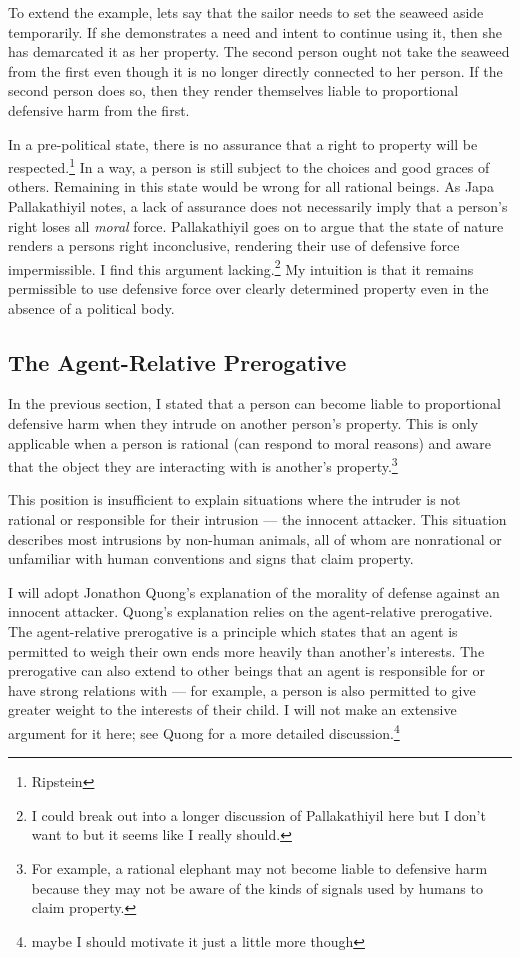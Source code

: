 	To extend the example, lets say that the sailor needs to set the seaweed
	aside temporarily. If she demonstrates a need and intent to continue using
	it, then she has demarcated it as her property. The second person ought not
	take the seaweed from the first even though it is no longer directly
	connected to her person. If the second person does so, then they render
	themselves liable to proportional defensive harm from the first.

	In a pre-political state, there is no assurance that a right to property
	will be respected.\footnote{Ripstein} In a way, a person is still subject
	to the choices and good graces of others. Remaining in this state would be
	wrong for all rational beings. As Japa Pallakathiyil notes, a lack of
	assurance does not necessarily imply that a person’s right loses all
	\emph{moral} force. Pallakathiyil goes on to argue that the state of nature
	renders a persons right inconclusive, rendering their use of defensive
	force impermissible. I find this argument lacking.\footnote{I could break
	out into a longer discussion of Pallakathiyil here but I don’t want to but
	it seems like I really should.} My intuition is that it remains permissible
	to use defensive force over clearly determined property even in the absence
	of a political body.

	\subsection{The Agent-Relative Prerogative}

	In the previous section, I stated that a person can become liable to
	proportional defensive harm when they intrude on another person’s property.
	This is only applicable when a person is rational (can respond to moral
	reasons) and aware that the object they are interacting with is another’s
	property.\footnote{For example, a rational elephant may not become liable
	to defensive harm because they may not be aware of the kinds of signals
	used by humans to claim property.}

	This position is insufficient to explain situations where the intruder is
	not rational or responsible for their intrusion --- the innocent attacker.
	This situation describes most intrusions by non-human animals, all of whom
	are nonrational or unfamiliar with human conventions and signs that claim
	property.

	I will adopt Jonathon Quong’s explanation of the morality of defense against
	an innocent attacker. Quong’s explanation relies on the agent-relative
	prerogative. The agent-relative prerogative is a principle which states that
	an agent is permitted to weigh their own ends more heavily than another’s
	interests. The prerogative can also extend to other beings that an agent is
	responsible for or have strong relations with --- for example, a person is
	also permitted to give greater weight to the interests of their child. I
	will not make an extensive argument for it here; see Quong for a more
	detailed discussion.\footnote{maybe I should motivate it just a little more
	though}

